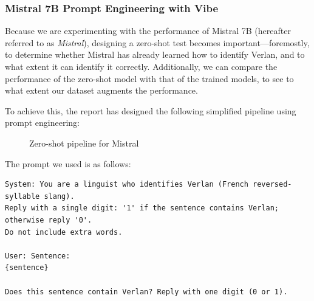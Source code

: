 \documentclass[12pt]{article}
\begin{document}
\subsubsection{Mistral 7B Prompt Engineering with Vibe}

Because we are experimenting with the performance of Mistral 7B (hereafter referred to as \textit{Mistral}), designing a zero-shot test becomes important\;---\;foremostly, to determine whether Mistral has already learned how to identify Verlan, and to what extent it can identify it correctly. Additionally, we can compare the performance of the zero-shot model with that of the trained models, to see to what extent our dataset augments the performance.

To achieve this, the report has designed the following simplified pipeline using prompt engineering:

\begin{figure}[H]
    \centering
    \caption{Zero-shot pipeline for Mistral}
    \label{fig:mistral-zeroshot-pipeline}
\end{figure}

The prompt we used is as follows:

\lstset{
  basicstyle=\ttfamily\small,
  frame=single,
  xleftmargin=2em,
  xrightmargin=2em,
  breaklines=true
}

\begin{lstlisting}
System: You are a linguist who identifies Verlan (French reversed-syllable slang).
Reply with a single digit: '1' if the sentence contains Verlan; otherwise reply '0'.
Do not include extra words.

User: Sentence:
{sentence}

Does this sentence contain Verlan? Reply with one digit (0 or 1).
\end{lstlisting}
\end{document}
